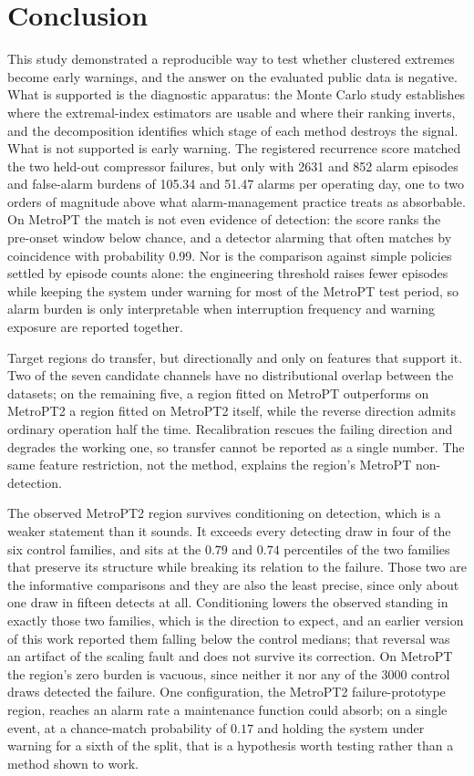 \section{Conclusion}
\label{sec:conclusion}

This study demonstrated a reproducible way to test whether clustered extremes become early warnings, and the answer on the evaluated public data is negative. What is supported is the diagnostic apparatus: the Monte Carlo study establishes where the extremal-index estimators are usable and where their ranking inverts, and the decomposition identifies which stage of each method destroys the signal. What is not supported is early warning. The registered recurrence score matched the two held-out compressor failures, but only with 2631 and 852 alarm episodes and false-alarm burdens of 105.34 and 51.47 alarms per operating day, one to two orders of magnitude above what alarm-management practice treats as absorbable. On MetroPT the match is not even evidence of detection: the score ranks the pre-onset window below chance, and a detector alarming that often matches by coincidence with probability 0.99. Nor is the comparison against simple policies settled by episode counts alone: the engineering threshold raises fewer episodes while keeping the system under warning for most of the MetroPT test period, so alarm burden is only interpretable when interruption frequency and warning exposure are reported together.

Target regions do transfer, but directionally and only on features that support it. Two of the seven candidate channels have no distributional overlap between the datasets; on the remaining five, a region fitted on MetroPT outperforms on MetroPT2 a region fitted on MetroPT2 itself, while the reverse direction admits ordinary operation half the time. Recalibration rescues the failing direction and degrades the working one, so transfer cannot be reported as a single number. The same feature restriction, not the method, explains the region's MetroPT non-detection.

The observed MetroPT2 region survives conditioning on detection, which is a weaker statement than it sounds. It exceeds every detecting draw in four of the six control families, and sits at the \(0.79\) and \(0.74\) percentiles of the two families that preserve its structure while breaking its relation to the failure. Those two are the informative comparisons and they are also the least precise, since only about one draw in fifteen detects at all. Conditioning lowers the observed standing in exactly those two families, which is the direction to expect, and an earlier version of this work reported them falling below the control medians; that reversal was an artifact of the scaling fault and does not survive its correction. On MetroPT the region's zero burden is vacuous, since neither it nor any of the 3000 control draws detected the failure. One configuration, the MetroPT2 failure-prototype region, reaches an alarm rate a maintenance function could absorb; on a single event, at a chance-match probability of \(0.17\) and holding the system under warning for a sixth of the split, that is a hypothesis worth testing rather than a method shown to work.

